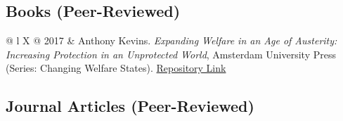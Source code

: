 \documentclass[letterpaper,fontsize=10.5pt]{scrartcl}
\begin{document}
\subsection{Books (Peer-Reviewed)}
\vspace{-2em}
\begin{longtblr}[entry=none,label=none]{@{} l X @{} }
	2017 & Anthony Kevins. \textit{Expanding Welfare in an Age of Austerity: Increasing Protection in an Unprotected World}, Amsterdam University Press (Series: Changing Welfare States). \href{https://repository.lboro.ac.uk/articles/book/Expanding_welfare_in_an_age_of_austerity_Increasing_protection_in_an_unprotected_world/9994709}{Repository Link}
\end{longtblr}

\vspace{-2em}
\subsection{Journal Articles (Peer-Reviewed)}
\vspace{-2em}
\end{document}
